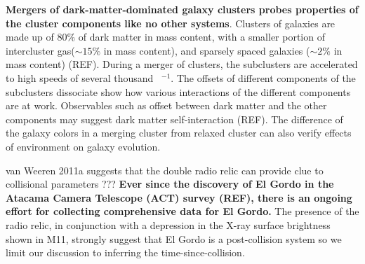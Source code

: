 

\textbf{Mergers of dark-matter-dominated galaxy clusters probes properties
of the cluster components like no other systems}. 
Clusters of galaxies are made up of 80\% of dark matter in mass content, 
with a smaller  portion of intercluster gas($\sim 15\%$ in mass content), and
sparsely spaced galaxies ($\sim 2\%$ in mass content) (REF). During a merger of
clusters, the subclusters are accelerated to high speeds of several
thousand \kilo \meter~\second$^{-1}$. The offsets of different components
of the subclusters dissociate show how various interactions of the different
components are at work. Observables such as offset between dark
matter and the other components may suggest dark matter self-interaction
(REF).  The difference of the galaxy colors in a merging cluster from relaxed cluster can also verify effects of environment on galaxy evolution.\par

van Weeren 2011a suggests that the double radio relic can provide clue to
collisional parameters ???
\textbf{Ever since the discovery of El Gordo in the Atacama Camera Telescope (ACT)
survey (REF), there is an ongoing effort for collecting comprehensive data
for El Gordo.}
The presence of the radio relic, in
conjunction with a depression in the X-ray surface brightness shown in M11,
strongly suggest that El Gordo is a post-collision system so we limit our
discussion to inferring the time-since-collision. 

